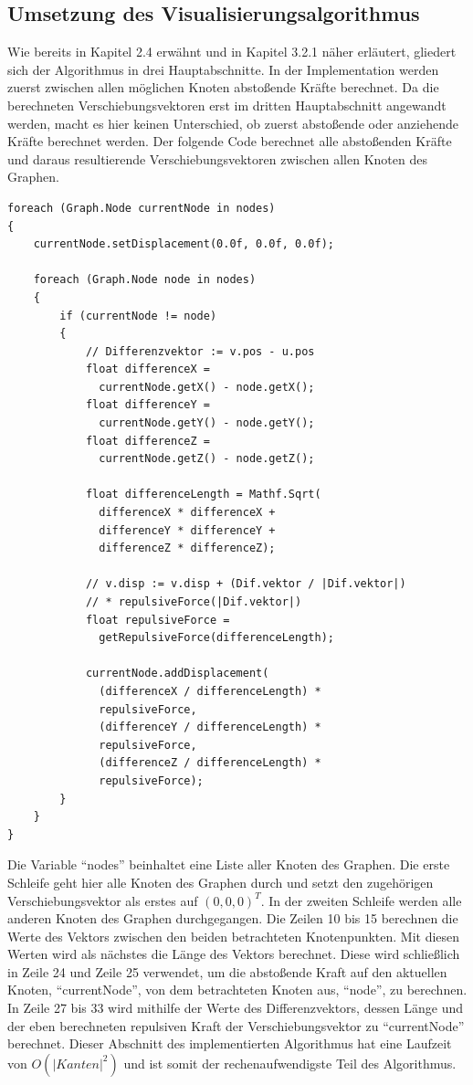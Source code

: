 \documentclass[12pt, a4paper]{article}
\begin{document}
\newpage
\subsection{Umsetzung des Visualisierungsalgorithmus}
Wie bereits in Kapitel 2.4 erwähnt und in Kapitel 3.2.1 näher erläutert, gliedert sich der Algorithmus in drei Hauptabschnitte. In der Implementation werden zuerst zwischen allen möglichen Knoten abstoßende Kräfte berechnet. Da die berechneten Verschiebungsvektoren erst im dritten Hauptabschnitt angewandt werden, macht es hier keinen Unterschied, ob zuerst abstoßende oder anziehende Kräfte berechnet werden. Der folgende Code berechnet alle abstoßenden Kräfte und daraus resultierende Verschiebungsvektoren zwischen allen Knoten des Graphen.
\begin{lstlisting}
foreach (Graph.Node currentNode in nodes)
{
	currentNode.setDisplacement(0.0f, 0.0f, 0.0f);
    
	foreach (Graph.Node node in nodes)
	{
		if (currentNode != node)
		{
			// Differenzvektor := v.pos - u.pos
			float differenceX =
              currentNode.getX() - node.getX();
			float differenceY =
              currentNode.getY() - node.getY();
			float differenceZ =
              currentNode.getZ() - node.getZ();

			float differenceLength = Mathf.Sqrt(
              differenceX * differenceX +
              differenceY * differenceY +
              differenceZ * differenceZ);

			// v.disp := v.disp + (Dif.vektor / |Dif.vektor|)
			// * repulsiveForce(|Dif.vektor|)
			float repulsiveForce =
              getRepulsiveForce(differenceLength);
                
			currentNode.addDisplacement(
              (differenceX / differenceLength) *
              repulsiveForce,
              (differenceY / differenceLength) *
              repulsiveForce,
              (differenceZ / differenceLength) *
              repulsiveForce);
		}
	}
}
\end{lstlisting}
Die Variable "`nodes"' beinhaltet eine Liste aller Knoten des Graphen. Die erste Schleife geht hier alle Knoten des Graphen durch und setzt den zugehörigen Verschiebungsvektor als erstes auf $(0, 0, 0)^T$. In der zweiten Schleife werden alle anderen Knoten des Graphen durchgegangen. Die Zeilen 10 bis 15 berechnen die Werte des Vektors zwischen den beiden betrachteten Knotenpunkten. Mit diesen Werten wird als nächstes die Länge des Vektors berechnet. Diese wird schließlich in Zeile 24 und Zeile 25 verwendet, um die abstoßende Kraft auf den aktuellen Knoten, "`currentNode"', von dem betrachteten Knoten aus, "`node"', zu berechnen. In Zeile 27 bis 33 wird mithilfe der Werte des Differenzvektors, dessen Länge und der eben berechneten repulsiven Kraft der Verschiebungsvektor zu "`currentNode"' berechnet. Dieser Abschnitt des implementierten Algorithmus hat eine Laufzeit von $O(|Kanten|^2)$ und ist somit der rechenaufwendigste Teil des Algorithmus.\\
\end{document}
